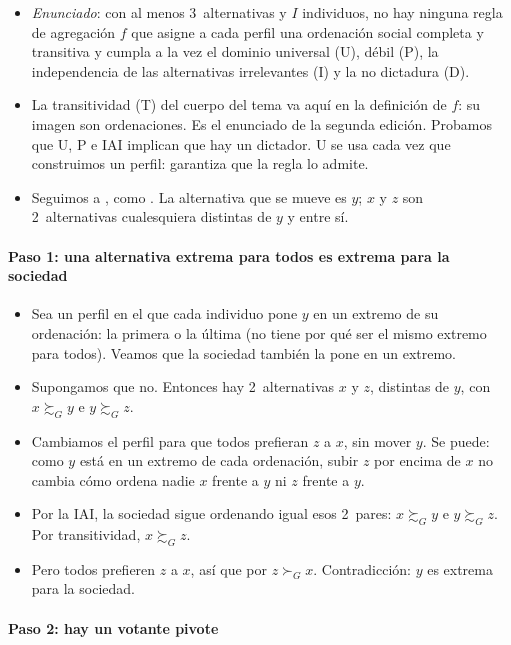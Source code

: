 \documentclass[11pt]{article}
\begin{document}
\begin{itemize}
\item \emph{Enunciado}: con al menos 3~alternativas y $I$ individuos, no hay ninguna regla de agregación $f$ que asigne a cada perfil una ordenación social completa y transitiva y cumpla a la vez el dominio universal (U),  débil (P), la independencia de las alternativas irrelevantes (\textup{I}) y la no dictadura (D).
\item La transitividad (T) del cuerpo del tema va aquí en la definición de $f$: su imagen son ordenaciones. Es el enunciado de la segunda edición\nocite{Arrow1963Social}. Probamos que U, P e IAI implican que hay un dictador. U se usa cada vez que construimos un perfil: garantiza que la regla lo admite.
\item Seguimos a \textcite{Geanakoplos2005Three}, como \textcite[teorema~6.1]{JehleReny2011Advanced}. La alternativa que se mueve es $y$; $x$ y $z$ son 2~alternativas cualesquiera distintas de $y$ y entre sí.
\end{itemize}

\paragraph{Paso 1: una alternativa extrema para todos es extrema para la sociedad}

\begin{itemize}
\item Sea un perfil en el que cada individuo pone $y$ en un extremo de su ordenación: la primera o la última (no tiene por qué ser el mismo extremo para todos). Veamos que la sociedad también la pone en un extremo.
\item Supongamos que no. Entonces hay 2~alternativas $x$ y $z$, distintas de $y$, con $x\succsim_Gy$ e $y\succsim_Gz$.
\item Cambiamos el perfil para que todos prefieran $z$ a $x$, sin mover $y$. Se puede: como $y$ está en un extremo de cada ordenación, subir $z$ por encima de $x$ no cambia cómo ordena nadie $x$ frente a $y$ ni $z$ frente a $y$.
\item Por la IAI, la sociedad sigue ordenando igual esos 2~pares: $x\succsim_Gy$ e $y\succsim_Gz$. Por transitividad, $x\succsim_Gz$.
\item Pero todos prefieren $z$ a $x$, así que por  $z\succ_Gx$. Contradicción: $y$ es extrema para la sociedad.\findemo
\end{itemize}

\paragraph{Paso 2: hay un votante pivote}
\end{document}
